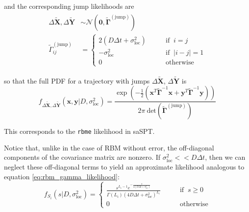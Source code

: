 \documentclass{article}
\renewcommand{\vec}{\mathbf}
\begin{document}
and the corresponding jump likelihoods are 
\begin{align}\begin{split}\label{eq:rbme_likelihood}
	\Delta \tilde{\vec{X}}, \Delta \tilde{\vec{Y}} &\sim \mathcal{N} \left( \vec{0}, \tilde{\boldsymbol{\Gamma}}^{(\text{jump})} \right) \\
	\tilde{\Gamma}^{(\text{jump})}_{ij} &= \begin{cases}
		2 (D \Delta t + \sigma_{\text{loc}}^{2} ) \qquad &\text{if } \: i = j \\
		- \sigma_{\text{loc}}^{2} \qquad &\text{if } \: \left| i - j \right| = 1 \\
		0 \qquad &\text{otherwise}
	\end{cases}
\end{split}\end{align}

so that the full PDF for a trajectory with jumps $\Delta \tilde{\vec{X}}$, 
$\Delta \tilde{\vec{Y}}$ is 
\begin{equation}\label{eq:rbme_pdf}
	f_{\Delta \tilde{\vec{X}}, \Delta \tilde{\vec{Y}}} \left( \vec{x}, \vec{y} | D, \sigma_{\text{loc}}^{2} \right) = \frac{
		\exp \left( - \frac{1}{2} \left( 
			\vec{x}^{T} \tilde{\boldsymbol{\Gamma}}^{-1} \vec{x} + 
			\vec{y}^{T} \tilde{\boldsymbol{\Gamma}}^{-1} \vec{y}
		\right) \right)
	}{
		2 \pi \: \text{det} \left( \tilde{\boldsymbol{\Gamma}}^{(\text{jump})} \right)
	}
\end{equation}

This corresponds to the \verb|rbme| likelihood in saSPT. \newline

Notice that, unlike in the case of RBM without error, the off-diagonal components of 
the covariance matrix are nonzero. If $\sigma_{\text{loc}}^{2} << D \Delta t$, then we
can neglect these off-diagonal terms to yield an approximate likelihood analogous to 
equation \ref{eq:rbm_gamma_likelihood}:
\begin{equation}\label{eq:rbme_gamma_approximation}
	f_{S_{i}} (s | D, \sigma_{\text{loc}}^{2}) = \begin{cases}
		\frac{
			s^{L_{i} - 1} e^{-\frac{s}{4 (D \Delta t + \sigma_{\text{loc}}^{2}) }}
		}{
			\Gamma \left( L_{i} \right) (4 D \Delta t + \sigma_{\text{loc}}^{2} )^{L_{i}}
		} \qquad &\text{if } \: s \geq 0 \\
		0 \qquad &\text{otherwise}
	\end{cases}	
\end{equation}
\end{document}
